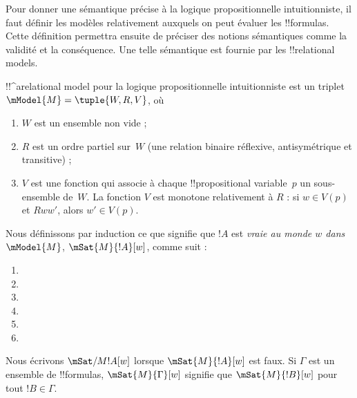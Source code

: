 \documentclass[../../../include/open-logic-section]{subfiles}
\begin{document}


Pour donner une sémantique précise à la logique propositionnelle
intuitionniste, il faut définir les modèles relativement auxquels on
peut évaluer les !!{formula}s. Cette définition permettra ensuite de
préciser des notions sémantiques comme la validité et la conséquence.
Une telle sémantique est fournie par les !!{relational model}s.

\begin{defn}
  !!^a{relational model} pour la logique propositionnelle
  intuitionniste est un triplet $\mModel{M} = \tuple{W, R, V}$, où
  \begin{enumerate}
  \item $W$ est un ensemble non vide ;
  \item $R$ est un ordre partiel sur~$W$ (une relation binaire réflexive,
    antisymétrique et transitive) ;
  \item $V$ est une fonction qui associe à chaque !!{propositional
    variable}~$p$ un sous-ensemble de~$W$. La fonction
    $V$ est monotone relativement à $R$ : si $w
    \in V(p)$ et $Rww'$, alors $w' \in V(p)$.
  \end{enumerate}
\end{defn}

\begin{defn}
  Nous définissons par induction ce que signifie que $!A$ est
  \emph{vraie au monde $w$ dans $\mModel{M}$},
  $\mSat{M}{!A}[w]$, comme suit :
  \begin{enumerate}
  \item {}
  \item {}
  \item {}
  \item {}
  \item {}
  \item {}
  \end{enumerate}
  Nous écrivons $\mSat/{M}{!A}[w]$ lorsque $\mSat{M}{!A}[w]$ est faux.
  Si $\Gamma$ est un ensemble de !!{formula}s,
  $\mSat{M}{\Gamma}[w]$ signifie que $\mSat{M}{!B}[w]$ pour tout
  $!B \in \Gamma$.
\end{defn}
\end{document}
